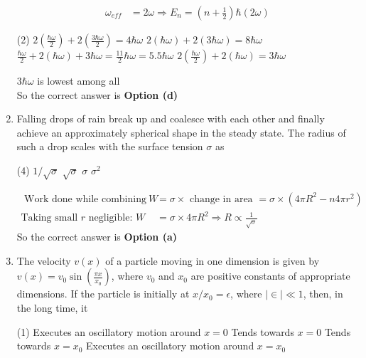 \begin{enumerate}
\begin{answer}
\begin{align*}
\omega_{e f f}&=2 \omega \Rightarrow E_{n}=\left(n+\frac{1}{2}\right) \hbar(2 \omega)
	\end{align*}
	 \begin{tasks}(2)
		\task[\text{a.}] $2\left(\frac{\hbar \omega}{2}\right)+2\left(\frac{3 \hbar \omega}{2}\right)=4 \hbar \omega$
		\task[\text{b.}]$2(\hbar \omega)+2(3 \hbar \omega)=8 \hbar \omega$
		\task[\text{c.}]$\frac{\hbar \omega}{2}+2(\hbar \omega)+3 \hbar \omega=\frac{11}{2} \hbar \omega=5.5 \hbar \omega$
		\task[\text{d.}] $2\left(\frac{\hbar \omega}{2}\right)+2(\hbar \omega)=3 \hbar \omega$
	\end{tasks}
$3 \hbar \omega$ is lowest among all\\
		So the correct answer is \textbf{Option (d)}
\end{answer}
\item  Falling drops of rain break up and coalesce with each other and finally achieve an approximately spherical shape in the steady state. The radius of such a drop scales with the surface tension $\sigma$ as
	 \begin{tasks}(4)
		\task[\textbf{a.}]$1 / \sqrt{\sigma}$
		\task[\textbf{b.}] $\sqrt{\sigma}$
		\task[\textbf{c.}]$\sigma$
		\task[\textbf{d.}] $\sigma^{2}$
	\end{tasks}
\begin{answer}
	\begin{align*}
\text{ Work done while combining }W&=\sigma \times\text{ change in area }=\sigma \times\left(4 \pi R^{2}-n 4 \pi r^{2}\right)\\
	\text{Taking small $r$ negligible: }W&=\sigma \times 4 \pi R^{2} \Rightarrow R \propto \frac{1}{\sqrt{\sigma}}
	\end{align*}
		So the correct answer is \textbf{Option (a)}
\end{answer}
\item  The velocity $v(x)$ of a particle moving in one dimension is given by $v(x)=v_{0} \sin \left(\frac{\pi x}{x_{0}}\right)$, where $v_{0}$ and $x_{0}$ are positive constants of appropriate dimensions. If the particle is initially at $x / x_{0}=\epsilon$, where $|\in| \ll 1$, then, in the long time, it
	 \begin{tasks}(1)
		\task[\textbf{a.}] Executes an oscillatory motion around $x=0$
		\task[\textbf{b.}]Tends towards $x=0$
		\task[\textbf{c.}] Tends towards $x=x_{0}$
		\task[\textbf{d.}] Executes an oscillatory motion around $x=x_{0}$
	\end{tasks}
\begin{answer}
	\begin{align*}

\end{align*}
\end{answer}
\end{enumerate}

